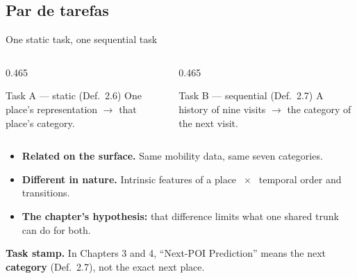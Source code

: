 \documentclass{beamer}
\begin{document}

\subsection{Par de tarefas}

\begin{frame}{One static task, one sequential task}

    \begin{columns}[t,onlytextwidth]
        \begin{column}{0.465\textwidth}
            \begin{block}{Task A --- static (Def.~2.6)}
                One place's representation $\rightarrow$ that place's category.
            \end{block}
        \end{column}
        \hfill
        \begin{column}{0.465\textwidth}
            \begin{block}{Task B --- sequential (Def.~2.7)}
                A history of nine visits $\rightarrow$ the category of the next visit.
            \end{block}
        \end{column}
    \end{columns}

    \medskip
    \begin{itemize}
        \item \textbf{Related on the surface.} Same mobility data, same seven categories.
        \item \textbf{Different in nature.} Intrinsic features of a place $\;\times\;$ temporal order and transitions.
        \item \textbf{The chapter's hypothesis:} that difference limits what one shared trunk can do for both.
    \end{itemize}

    \vfill
    {\scriptsize\color{secondary}\textbf{Task stamp.} In Chapters 3 and 4, ``Next-POI Prediction'' means the next \textbf{category} (Def.~2.7), not the exact next place.\par}
\end{frame}
\end{document}
